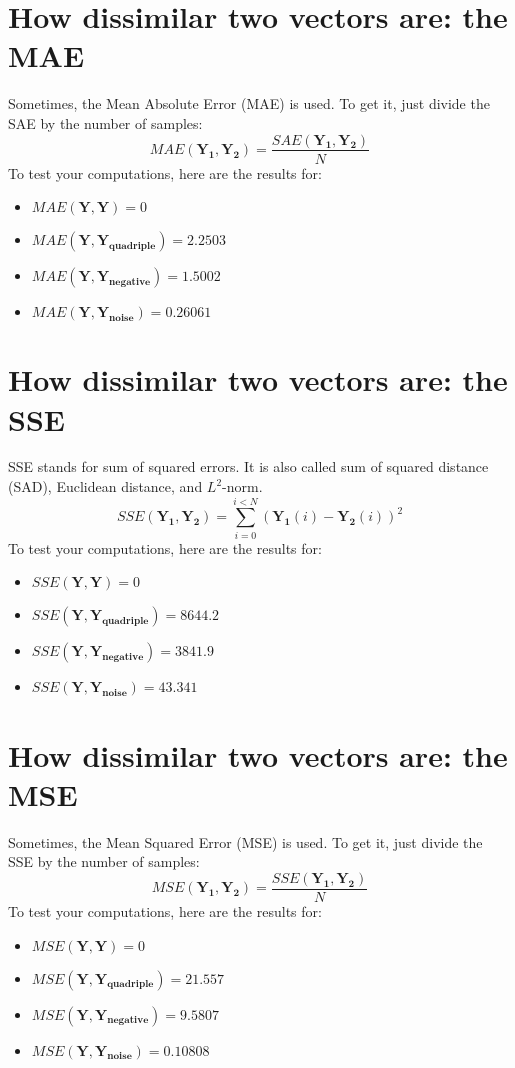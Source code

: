 \documentclass[english,a4paper,12pt,oneside]{article}
\begin{document}
\section{How dissimilar two vectors are: the MAE}

Sometimes, the Mean Absolute Error (MAE) is used. To get it, just divide the SAE by the number of samples:
\begin{equation}
MAE(\mathbf{Y_1}, \mathbf{Y_2}) = \frac{SAE(\mathbf{Y_1}, \mathbf{Y_2})}{N}
\end{equation}
To test your computations, here are the results for:
\begin{itemize}
\item $MAE(\mathbf{Y}, \mathbf{Y}) =  0$
\item $MAE(\mathbf{Y}, \mathbf{Y_{quadriple}}) =  2.2503$
\item $MAE(\mathbf{Y}, \mathbf{Y_{negative}}) =  1.5002$
\item $MAE(\mathbf{Y}, \mathbf{Y_{noise}}) =  0.26061$
\end{itemize}

\section{How dissimilar two vectors are: the SSE}

SSE stands for sum of squared  errors. It is also called sum of squared distance (SAD), Euclidean distance, and $L^2$-norm.  
\begin{equation}
SSE(\mathbf{Y_1}, \mathbf{Y_2}) = \sum^{i < N}_{i=0} (\mathbf{Y_1}(i)-\mathbf{Y_2}(i))^2
\end{equation}
To test your computations, here are the results for:
\begin{itemize}
\item $SSE(\mathbf{Y}, \mathbf{Y}) =  0$
\item $SSE(\mathbf{Y}, \mathbf{Y_{quadriple}}) =  8644.2$
\item $SSE(\mathbf{Y}, \mathbf{Y_{negative}}) =  3841.9$
\item $SSE(\mathbf{Y}, \mathbf{Y_{noise}}) =  43.341$
\end{itemize}


\section{How dissimilar two vectors are: the MSE}

Sometimes, the Mean Squared Error (MSE) is used. To get it, just divide the SSE by the number of samples:
\begin{equation}
MSE(\mathbf{Y_1}, \mathbf{Y_2}) = \frac{SSE(\mathbf{Y_1}, \mathbf{Y_2})}{N}
\end{equation}
To test your computations, here are the results for:
\begin{itemize}
\item $MSE(\mathbf{Y}, \mathbf{Y}) =  0$
\item $MSE(\mathbf{Y}, \mathbf{Y_{quadriple}}) =  21.557$
\item $MSE(\mathbf{Y}, \mathbf{Y_{negative}}) =  9.5807$
\item $MSE(\mathbf{Y}, \mathbf{Y_{noise}}) =  0.10808$
\end{itemize}
\end{document}
